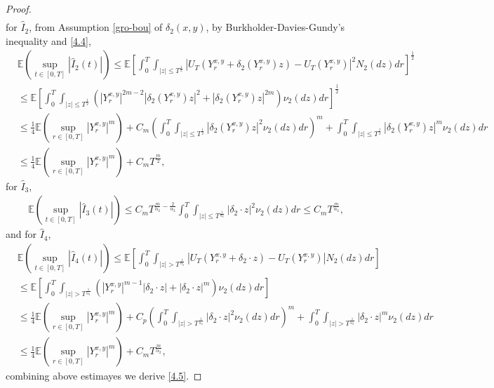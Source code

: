 \documentclass[11pt,reqno]{amsart}
\numberwithin{equation}{section}
\newcommand{\de}{\delta}
\begin{document}
\begin{proof}
\begin{align*}
	\end{align*}
for $\hat{I}_{2}$,  from Assumption \ref{gro-bou} of $\delta_{2}(x,y)$, by Burkholder-Davies-Gundy's inequality and \eqref{4.4},
	\begin{align*}
			&\mathbb{E}\left(\sup_{t\in [0,T]} |\hat{I}_{2}(t)|\right)\leq \mathbb{E}\left[ \int_{0}^{T} \int_{|z|\leq T^{\frac{1}{2}}}\left|  U_{T}(Y_{r}^{ x,y}+\delta_{2}(Y_{r}^{ x,y})z)-U_{T}(Y_{r}^{ x,y}) \right|^{2}  N_{2}(dz)dr\right] ^{\frac{1}{2}}\\
			&\leq \mathbb{E}\left[ \int_{0}^{T} \int_{|z|\leq T^{\frac{1}{2}}}\left( \left| Y_{r}^{ x,y}  \right|^{2m-2}|\delta_{2}(Y_{r}^{ x,y})z|^{2}+|\delta_{2}(Y_{r}^{ x,y})z|^{2m} \right)  \nu_{2}(dz)dr\right] ^{\frac{1}{2}}\\
			&\leq \frac{1}{4}\mathbb{E} \left(\sup_{r\in [0,T]} |Y_{r}^{ x,y}|^{m}\right)+C_{m}\left(\int_{0}^{T} \int_{|z|\leq T^{\frac{1}{2}}} |\delta_{2}(Y_{r}^{ x,y})z|^{2}  \nu_{2}(dz)dr\right) ^{m}+\int_{0}^{T} \int_{|z|\leq T^{\frac{1}{2}}} |\delta_{2}(Y_{r}^{ x,y})z|^{m}  \nu_{2}(dz)dr\\
			&\leq \frac{1}{4}\mathbb{E} \left(\sup_{r\in [0,T]} |Y_{r}^{ x,y}|^{m}\right)+C_{m}T^{\frac{m}{2}},
	\end{align*}
	for $\hat{I}_{3}$,
\begin{align*}
	&\mathbb{E}\left(\sup_{t\in [0,T]} |\hat{I}_{3}(t)|\right)\leq C_{m}T^{\frac{m}{\alpha_{2}}-\frac{2}{\alpha_{2}}}\int_{0}^{T}\int_{|z|\leq T^{\frac{1}{\alpha_{2}}}}|\de_2\cdot  z|^{2}\nu_{2}(dz)dr\leq C_{m}T^{\frac{m}{\alpha_{2}}},
\end{align*}
and	for $\hat{I}_{4}$,
\begin{align*}
	&\mathbb{E}\left(\sup_{t\in [0,T]} |\hat{I}_{4}(t)|\right)\leq \mathbb{E}\left[ \int_{0}^{T} \int_{|z|> T^{\frac{1}{\alpha_{2}}}}\left|  U_{T}(Y_{r}^{ x,y}+\de_2\cdot z)-U_{T}(Y_{r}^{ x,y}) \right|  N_{2}(dz)dr\right] \\
	&\leq \mathbb{E}\left[ \int_{0}^{T} \int_{|z|>T^{\frac{1}{\alpha_{2}}}}\left( \left| Y_{r}^{ x,y}  \right|^{m-1}|\de_2\cdot z|+|\de_2\cdot z|^{m} \right)  \nu_{2}(dz)dr\right]\\
	&\leq \frac{1}{4}\mathbb{E} \left(\sup_{r\in [0,T]} |Y_{r}^{ x,y}|^{m}\right)+C_{p}\left(\int_{0}^{T} \int_{|z|>T^{\frac{1}{\alpha_{2}}}} |\de_2\cdot z|^{2}  \nu_{2}(dz)dr\right) ^{m}+\int_{0}^{T} \int_{|z|> T^{\frac{1}{\alpha_{2}}}} |\de_2\cdot z|^{m}  \nu_{2}(dz)dr\\
	&\leq \frac{1}{4}\mathbb{E} \left(\sup_{r\in [0,T]} |Y_{r}^{ x,y}|^{m}\right)+C_{m}T^{\frac{m}{\alpha_{2}}},
\end{align*}
combining above estimayes  we derive \eqref{4.5}.
\end{proof}
\end{document}
